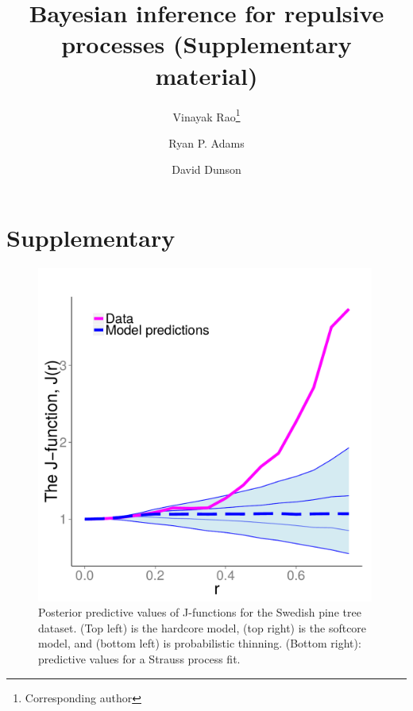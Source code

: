 \documentclass{statsoc}
\title{Bayesian inference for \matern repulsive processes (Supplementary material)}
\author{Vinayak Rao\thanks{Corresponding author}}
\author{Ryan P. Adams}
\author{David Dunson}
\date{}
\begin{document}
\maketitle

\section{Supplementary}

  \begin{figure}
  \begin{minipage}[h]{0.22\linewidth}
  \caption[Post Pred]{Posterior predictive values of J-functions for the Swedish pine tree dataset. (Top left) is the \matern hardcore model,
  (top right) is the softcore model, and (bottom left) is probabilistic thinning. (Bottom right): predictive values for a Strauss process fit.}
  \label{fig:swed_J_pred}
  \end{minipage}
  \begin{minipage}[h]{0.76\linewidth}
  \begin{minipage}[h]{0.49\linewidth}
  \centering
  \includegraphics[width=0.99\textwidth]{figs/Jfunc_postpred_R10/swed_hc.pdf}
  \end{minipage}
  \begin{minipage}[h]{0.49\linewidth}
  \centering

\end{minipage}
\end{minipage}
\end{figure}
\end{document}
